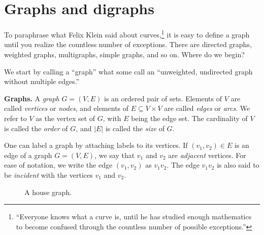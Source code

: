 
\section{Graphs and digraphs}

To paraphrase what Felix Klein said about curves,\footnote{
``Everyone knows what a curve is, until he has studied enough
mathematics to become confused through the countless number of
possible exceptions.''}
it is easy to define a graph until you realize the countless number of
exceptions. There are directed graphs, weighted graphs, multigraphs,
simple graphs, and so on. Where do we begin?

We start by calling a ``graph'' what some call an ``unweighted,
undirected graph without multiple edges.''

\begin{definition}
\textbf{Graphs.}
A \emph{graph} $G = (V, E)$ is an ordered pair of sets. Elements of
$V$ are called \emph{vertices} or \emph{nodes}, and elements of
$E \subseteq V \times V$ are called \emph{edges} or \emph{arcs}. We
refer to $V$ as the vertex set of $G$, with $E$ being the edge
set. The cardinality of $V$ is called the \emph{order} of $G$, and
$|E|$ is called the \emph{size} of $G$.
\end{definition}

One can label a graph by attaching labels to its vertices. If $(v_1,
v_2) \in E$ is an edge of a graph $G = (V, E)$, we say that $v_1$ and
$v_2$ are \emph{adjacent} vertices. For ease of notation, we write the
edge $(v_1, v_2)$ as $v_1 v_2$. The edge $v_1 v_2$ is also said to be
\emph{incident} with the vertices $v_1$ and $v_2$.

\begin{figure}[!htbp]
\centering
{}
\caption{A house graph.}
\label{fig:introduction:house_graph}
\end{figure}


